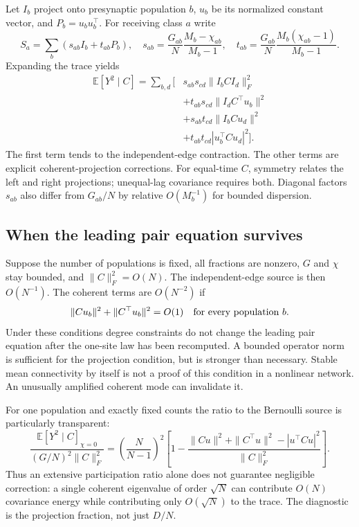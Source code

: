 Let $I_b$ project onto presynaptic population $b$, $u_b$ be its normalized
constant vector, and $P_b=u_bu_b^\top$. For receiving class $a$ write
\[
 S_a=\sum_b(s_{ab}I_b+t_{ab}P_b),\quad
 s_{ab}=\frac{G_{ab}}N\frac{M_b-\chi_{ab}}{M_b-1},\quad
 t_{ab}=\frac{G_{ab}}N\frac{M_b(\chi_{ab}-1)}{M_b-1}.
\]
Expanding the trace yields
\begin{align*}
 \mathbb E[Y^2\mid C]
 =\sum_{b,d}\big[&s_{ab}s_{cd}\|I_bCI_d\|_F^2\\
 &+t_{ab}s_{cd}\|I_d C^\top u_b\|^2\\
 &+s_{ab}t_{cd}\|I_b C u_d\|^2\\
 &+t_{ab}t_{cd}|u_b^\top C u_d|^2\big].
\end{align*}
The first term tends to the independent-edge contraction. The other terms
are explicit coherent-projection corrections. For equal-time $C$, symmetry
relates the left and right projections; unequal-lag covariance requires
both. Diagonal factors $s_{ab}$ also differ from $G_{ab}/N$ by relative
$O(M_b^{-1})$ for bounded dispersion.

\subsection{When the leading pair equation survives}
Suppose the number of populations is fixed, all fractions are nonzero,
$G$ and $\chi$ stay bounded, and $\|C\|_F^2=O(N)$. The independent-edge
source is then $O(N^{-1})$. The coherent terms are $O(N^{-2})$ if
\[
 \|Cu_b\|^2+\|C^\top u_b\|^2=O(1)
 \quad\hbox{for every population }b.
\]
Under these conditions degree constraints do not change the leading pair
equation after the one-site law has been recomputed. A bounded operator norm
is sufficient for the projection condition, but is stronger than necessary.
Stable mean connectivity by itself is not a proof of this condition in a
nonlinear network. An unusually amplified coherent mode can invalidate it.

For one population and exactly fixed counts the ratio to the Bernoulli
source is particularly transparent:
\[
 \frac{\mathbb E[Y^2\mid C]_{\chi=0}}
      {(G/N)^2\|C\|_F^2}
 =\left(\frac{N}{N-1}\right)^2
  \left[1-
  \frac{\|Cu\|^2+\|C^\top u\|^2-|u^\top Cu|^2}{\|C\|_F^2}\right].
\]
Thus an extensive participation ratio alone does not guarantee negligible
correction: a single coherent eigenvalue of order $\sqrt N$ can contribute
$O(N)$ covariance energy while contributing only $O(\sqrt N)$ to the trace.
The diagnostic is the projection fraction, not just $D/N$.

